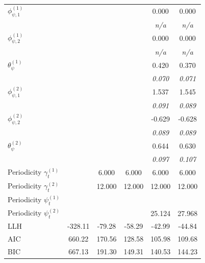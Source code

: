 \begin{table}[t!]
\begin{tabular}{lccccc}
$\phi_{\psi,1}^{(1)}$ &  &  &  & 0.000 & 0.000 \\
 &  &  &  & {\footnotesize\textit{n/a}} & {\footnotesize\textit{n/a}} \\
$\phi_{\psi,2}^{(1)}$ &  &  &  & 0.000 & 0.000 \\
 &  &  &  & {\footnotesize\textit{n/a}} & {\footnotesize\textit{n/a}} \\
$\theta_{\psi}^{(1)}$ &  &  &  & 0.420 & 0.370 \\
 &  &  &  & {\footnotesize\textit{0.070}} & {\footnotesize\textit{0.071}} \\
$\phi_{\psi,1}^{(2)}$ &  &  &  & 1.537 & 1.545 \\
 &  &  &  & {\footnotesize\textit{0.091}} & {\footnotesize\textit{0.089}} \\
$\phi_{\psi,2}^{(2)}$ &  &  &  & -0.629 & -0.628 \\
 &  &  &  & {\footnotesize\textit{0.089}} & {\footnotesize\textit{0.089}} \\
$\theta_{\psi}^{(2)}$ &  &  &  & 0.644 & 0.630 \\
 &  &  &  & {\footnotesize\textit{0.097}} & {\footnotesize\textit{0.107}} \\
\midrule
Periodicity $\gamma_t^{(1)}$ &  & 6.000 & 6.000 & 6.000 & 6.000 \\
Periodicity $\gamma_t^{(2)}$ &  & 12.000 & 12.000 & 12.000 & 12.000 \\
Periodicity $\psi_t^{(1)}$ &  &  &  &  &  \\
Periodicity $\psi_t^{(2)}$ &  &  &  & 25.124 & 27.968 \\
\midrule
LLH & -328.11 & -79.28 & -58.29 & -42.99 & -44.84 \\
AIC & 660.22 & 170.56 & 128.58 & 105.98 & 109.68 \\
BIC & 667.13 & 191.30 & 149.31 & 140.53 & 144.23 \\
\bottomrule
\end{tabular}
\end{table}
